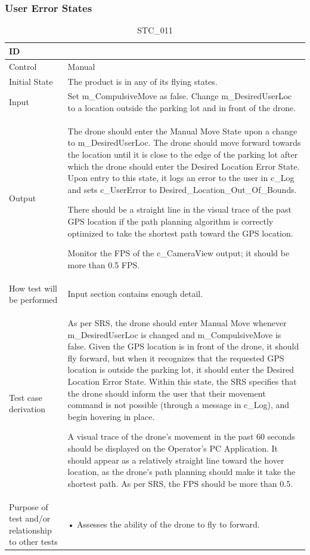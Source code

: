 \documentclass[12pt, titlepage]{article}
\begin{document}
\clearpage

\subsubsection{User Error States}
\label{usererrorTests}

\begin{table}[!h]
\begin{center}
\caption {STC\_011}
\label{tab:STC_011}
\begin{tabular}{ | m{3.2cm} | m{12.2cm} | } 
\hline
ID & \nameref{tab:STC_011} \\ 
\hline
Control & Manual \\ 
\hline
Initial State & The product is in any of its flying states.   \\ 
\hline
Input & Set m\_CompulsiveMove as false. Change m\_DesiredUserLoc to a location outside the parking lot and in front of the drone.  \\ 
\hline
Output & The drone should enter the Manual Move State upon a change to m\_DesiredUserLoc. The drone should move forward towards the location until it is close to the edge of the parking lot after which the drone should enter the Desired Location Error State. Upon entry to this state, it logs an error to the user in c\_Log and sets c\_UserError to Desired\_Location\_Out\_Of\_Bounds. 

There should be a straight line in the visual trace of the past GPS location if the path planning algorithm is correctly optimized to take the shortest path toward the GPS location. 

Monitor the FPS of the c\_CameraView output; it should be more than 0.5 FPS.  \\ 
\hline
How test will be performed & Input section contains enough detail. \\ 
\hline
Test case derivation & As per SRS, the drone should enter Manual Move whenever m\_DesiredUserLoc is changed and m\_CompulsiveMove is false. Given the GPS location is in front of the drone, it should fly forward, but when it recognizes that the requested GPS location is outside the parking lot, it should enter the Desired Location Error State. Within this state, the SRS specifies that the drone should inform the user that their movement command is not possible (through a message in c\_Log), and begin hovering in place.

A visual trace of the drone's movement in the past 60 seconds should be displayed on the Operator's PC Application. It should appear as a relatively straight line toward the hover location, as the drone's path planning should make it take the shortest path. 
As per SRS, the FPS should be more than 0.5.
 \\ 
\hline
Purpose of test and/or relationship to other tests & 
• Assesses the ability of the drone to fly to forward.


\end{tabular}
\end{center}
\end{table}
\end{document}
